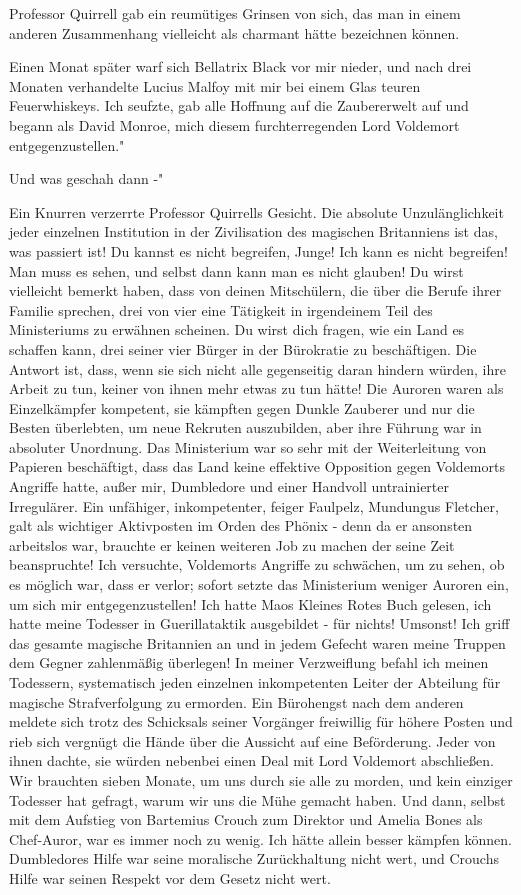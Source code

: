 Professor Quirrell gab ein reumütiges Grinsen von sich, das man in einem anderen
Zusammenhang vielleicht als charmant hätte bezeichnen können.

\glqq{}Einen Monat später warf sich Bellatrix Black vor mir nieder, und nach drei
Monaten verhandelte Lucius Malfoy mit mir bei einem Glas teuren Feuerwhiskeys.
Ich seufzte, gab alle Hoffnung auf die Zaubererwelt auf und begann als David
Monroe, mich diesem furchterregenden Lord Voldemort entgegenzustellen."

\glqq{}Und was geschah dann -"

Ein Knurren verzerrte Professor Quirrells Gesicht. \glqq{}Die absolute
Unzulänglichkeit jeder einzelnen Institution in der Zivilisation des magischen
Britanniens ist das, was passiert ist! Du kannst es nicht begreifen, Junge! Ich
kann es nicht begreifen! Man muss es sehen, und selbst dann kann man es nicht
glauben! Du wirst vielleicht bemerkt haben, dass von deinen Mitschülern, die
über die Berufe ihrer Familie sprechen, drei von vier eine Tätigkeit in
irgendeinem Teil des Ministeriums zu erwähnen scheinen. Du wirst dich fragen,
wie ein Land es schaffen kann, drei seiner vier Bürger in der Bürokratie zu
beschäftigen. Die Antwort ist, dass, wenn sie sich nicht alle gegenseitig daran
hindern würden, ihre Arbeit zu tun, keiner von ihnen mehr etwas zu tun hätte!
Die Auroren waren als Einzelkämpfer kompetent, sie kämpften gegen Dunkle
Zauberer und nur die Besten überlebten, um neue Rekruten auszubilden, aber ihre
Führung war in absoluter Unordnung. Das Ministerium war so sehr mit der
Weiterleitung von Papieren beschäftigt, dass das Land keine effektive Opposition
gegen Voldemorts Angriffe hatte, außer mir, Dumbledore und einer Handvoll
untrainierter Irregulärer. Ein unfähiger, inkompetenter, feiger Faulpelz,
Mundungus Fletcher, galt als wichtiger Aktivposten im Orden des Phönix - denn da
er ansonsten arbeitslos war, brauchte er keinen weiteren Job zu machen der seine
Zeit beanspruchte! Ich versuchte, Voldemorts Angriffe zu schwächen, um zu sehen,
ob es möglich war, dass er verlor; sofort setzte das Ministerium weniger Auroren
ein, um sich mir entgegenzustellen! Ich hatte Maos Kleines Rotes Buch gelesen,
ich hatte meine Todesser in Guerillataktik ausgebildet - für nichts! Umsonst!
Ich griff das gesamte magische Britannien an und in jedem Gefecht waren meine
Truppen dem Gegner zahlenmäßig überlegen! In meiner Verzweiflung befahl ich
meinen Todessern, systematisch jeden einzelnen inkompetenten Leiter der
Abteilung für magische Strafverfolgung zu ermorden. Ein Bürohengst nach dem
anderen meldete sich trotz des Schicksals seiner Vorgänger freiwillig für höhere
Posten und rieb sich vergnügt die Hände über die Aussicht auf eine Beförderung.
Jeder von ihnen dachte, sie würden nebenbei einen Deal mit Lord Voldemort
abschließen. Wir brauchten sieben Monate, um uns durch sie alle zu morden, und
kein einziger Todesser hat gefragt, warum wir uns die Mühe gemacht haben. Und
dann, selbst mit dem Aufstieg von Bartemius Crouch zum Direktor und Amelia Bones
als Chef-Auror, war es immer noch zu wenig. Ich hätte allein besser kämpfen
können. Dumbledores Hilfe war seine moralische Zurückhaltung nicht wert, und
Crouchs Hilfe war seinen Respekt vor dem Gesetz nicht wert.\grqq{}

